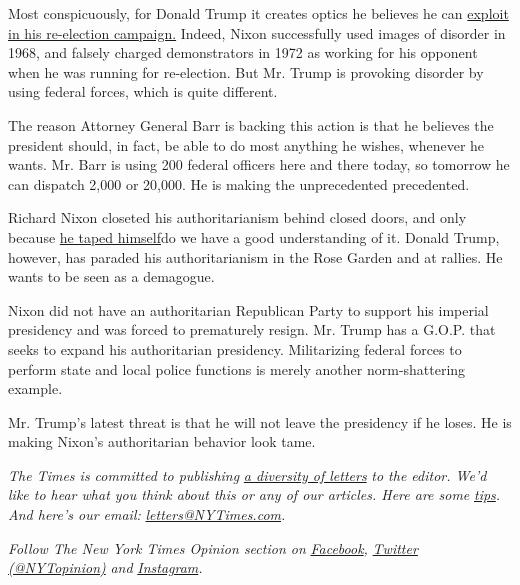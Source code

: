 Most conspicuously, for Donald Trump it creates optics he believes he
can
\href{https://www.nytimes3xbfgragh.onion/2020/07/21/us/politics/trump-portland-federal-agents.html}{exploit
in his re-election campaign.} Indeed, Nixon successfully used images of
disorder in 1968, and falsely charged demonstrators in 1972 as working
for his opponent when he was running for re-election. But Mr. Trump is
provoking disorder by using federal forces, which is quite different.

The reason Attorney General Barr is backing this action is that he
believes the president should, in fact, be able to do most anything he
wishes, whenever he wants. Mr. Barr is using 200 federal officers here
and there today, so tomorrow he can dispatch 2,000 or 20,000. He is
making the unprecedented precedented.

Richard Nixon closeted his authoritarianism behind closed doors, and
only because \href{http://nixontapes.org/}{he taped himself}do we have a
good understanding of it. Donald Trump, however, has paraded his
authoritarianism in the Rose Garden and at rallies. He wants to be seen
as a demagogue.

Nixon did not have an authoritarian Republican Party to support his
imperial presidency and was forced to prematurely resign. Mr. Trump has
a G.O.P. that seeks to expand his authoritarian presidency. Militarizing
federal forces to perform state and local police functions is merely
another norm-shattering example.

Mr. Trump's latest threat is that he will not leave the presidency if he
loses. He is making Nixon's authoritarian behavior look tame.

\emph{The Times is committed to publishing}
\href{https://www.nytimes3xbfgragh.onion/2019/01/31/opinion/letters/letters-to-editor-new-york-times-women.html}{\emph{a
diversity of letters}} \emph{to the editor. We'd like to hear what you
think about this or any of our articles. Here are some}
\href{https://help.nytimes3xbfgragh.onion/hc/en-us/articles/115014925288-How-to-submit-a-letter-to-the-editor}{\emph{tips}}\emph{.
And here's our email:}
\href{mailto:letters@NYTimes.com}{\emph{letters@NYTimes.com}}\emph{.}

\emph{Follow The New York Times Opinion section on}
\href{https://www.facebookcorewwwi.onion/nytopinion}{\emph{Facebook}}\emph{,}
\href{http://twitter.com/NYTOpinion}{\emph{Twitter (@NYTopinion)}}
\emph{and}
\href{https://www.instagram.com/nytopinion/}{\emph{Instagram}}\emph{.}

